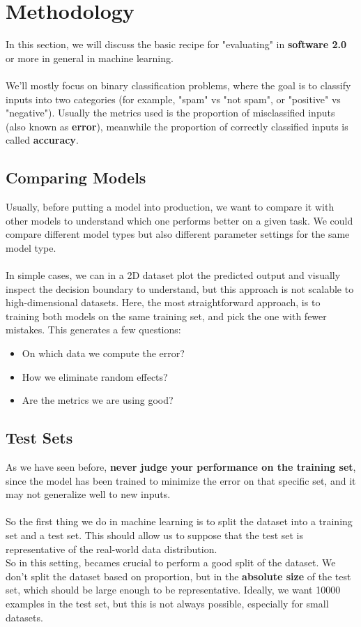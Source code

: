 \section{Methodology}
In this section, we will discuss the basic recipe for "evaluating" in \textbf{software 2.0} or more in general in machine learning.
\\\\
We'll mostly focus on binary classification problems, where the goal is to classify inputs into two categories (for example, "spam" vs "not spam", or "positive" vs "negative").
Usually the metrics used is the proportion of misclassified inputs (also known as \textbf{error}),
meanwhile the proportion of correctly classified inputs is called \textbf{accuracy}.

\subsection{Comparing Models}
Usually, before putting a model into production, we want to compare it with other models to understand which one performs better on a given task.
We could compare different model types but also different parameter settings for the same model type.
\\\\
In simple cases, we can in a 2D dataset plot the predicted output and visually inspect the decision boundary to understand,
but this approach is not scalable to high-dimensional datasets.
Here, the most straightforward approach, is to training both models on the same training set, and pick the one with fewer mistakes.
This generates a few questions:
\begin{itemize}
    \item On which data we compute the error? 
    \item How we eliminate random effects? 
    \item Are the metrics we are using good?
\end{itemize}

\subsection{Test Sets}
As we have seen before, \textbf{never judge your performance on the training set}, since the model has been trained to minimize the error on that specific set, and it may not generalize well to new inputs.
\\\\
So the first thing we do in machine learning is to split the dataset into a training set and a test set.
This should allow us to suppose that the test set is representative of the real-world data distribution.
\\
So in this setting, becames crucial to perform a good split of the dataset.
We don't split the dataset based on proportion, but in the \textbf{absolute size} of the test set, which should be large enough to be representative.
Ideally, we want 10000 examples in the test set, but this is not always possible, especially for small datasets.


